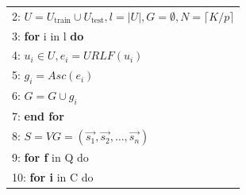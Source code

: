 \documentclass{ieeeaccess}
\begin{document}
\begin{table}[htp]
\begin{tabular}{l}
2: $U=U_{\text {train}} \cup U_{\text {test}}, l=|U|, G=\emptyset, N=\lceil K / p\rceil$
                            \\
3: \textbf{for} i in l \textbf{do}                                                                                                                                                                                                                \\
4: $u_{i} \in U, e_{i} = URLF(u_{i})$                                                                                                                                                                                                                                               \\
5: $g_{i} = Asc(e_{i})$                                                                                                                                                                                                                                                              \\
6: $G = G \cup g_{i}$                                                                                                                                                                                                                                                                \\
7: \textbf{end for}                                                                                                                                                                                                                                                \\
8: $S = VG = (\overrightarrow{s_{1}}, \overrightarrow{s_{2}}, \ldots, \overrightarrow{s_{n}})$                                                                                                                                                                                       \\
9: \textbf{for f} in Q do                                                                                                                                                                                                                                         \\
10: \hspace{3pt} \textbf{for i} in C do                                                                                                                                                                                                           \\

\end{tabular}
\end{table}
\end{document}
